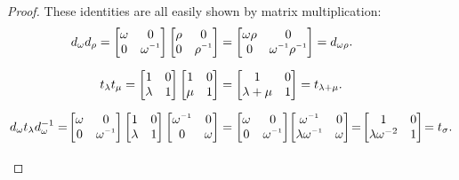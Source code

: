 \begin{proof} 
These identities are all easily shown by matrix multiplication:
\begin{align*} d_\omega d_\rho = \begin{bmatrix} \omega & 0 \\ 0 & \omega\inv \end{bmatrix} \begin{bmatrix} \rho & 0 \\ 0 & \rho\inv \end{bmatrix} &= \begin{bmatrix} \omega \rho & 0 \\ 0 & \omega\inv \rho\inv \end{bmatrix} = d_{\omega \rho}.
\\[1.5ex]
t_\lambda t_\mu = \begin{bmatrix} 1 & 0 \\ \lambda & 1 \end{bmatrix} \begin{bmatrix} 1 & 0 \\ \mu & 1 \end{bmatrix} &= \begin{bmatrix} 1 & 0 \\ \lambda + \mu & 1 \end{bmatrix} = t_{\lambda + \mu}.
\\[1.5ex]
 d_\omega t_\lambda d^{-1}_\omega = \! \begin{bmatrix} \omega & 0 \\ 0 & \omega\inv \end{bmatrix} \begin{bmatrix} 1 & 0 \\ \lambda & 1 \end{bmatrix} \begin{bmatrix} \omega\inv & 0 \\ 0 & \omega \end{bmatrix} &= \begin{bmatrix} \omega & 0 \\ 0 & \omega\inv \end{bmatrix} \! \begin{bmatrix} \omega\inv & 0 \\ \lambda \omega\inv & \omega \end{bmatrix} \! = \! \begin{bmatrix} 1 & 0 \\ \lambda \omega^{-2} & 1 \end{bmatrix} \! = t_\sigma.
\\[1.5ex]

\end{align*}
\end{proof}
